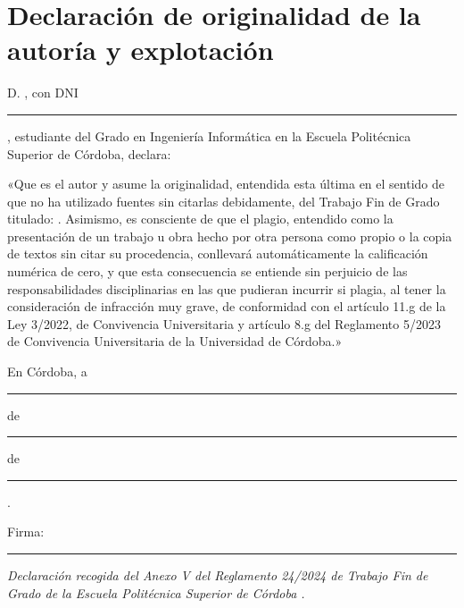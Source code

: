 
\chapter*{Declaración de originalidad de la autoría y explotación}

\noindent D. \thesisAuthor, con DNI \rule{4cm}{0.4pt}, estudiante del Grado en
Ingeniería Informática en la Escuela Politécnica Superior de Córdoba,
declara:

\medskip
\noindent «Que es el autor y asume la originalidad, entendida esta última en el
sentido de que no ha utilizado fuentes sin citarlas debidamente, del Trabajo Fin
de Grado titulado: \textit{\thesisTitle}. Asimismo, es consciente de que el
plagio, entendido como la presentación de un trabajo u obra hecho por otra
persona como propio o la copia de textos sin citar su procedencia, conllevará
automáticamente la calificación numérica de cero, y que esta consecuencia se
entiende sin perjuicio de las responsabilidades disciplinarias en las que
pudieran incurrir si plagia, al tener la consideración de infracción muy grave,
de conformidad con el artículo 11.g de la Ley 3/2022, de Convivencia
Universitaria y artículo 8.g del Reglamento 5/2023 de Convivencia Universitaria
de la Universidad de Córdoba.»

\vspace{1.5cm}
\noindent En Córdoba, a \rule{3cm}{0.4pt} de \rule{3cm}{0.4pt} de
\rule{2cm}{0.4pt}.

\vspace{1.5cm}
\noindent Firma: \rule{6cm}{0.4pt}

\medskip
\noindent\textit{Declaración recogida del Anexo V del Reglamento 24/2024 de
Trabajo Fin de Grado de la Escuela Politécnica Superior de Córdoba
\cite{reglamento2024}.}
